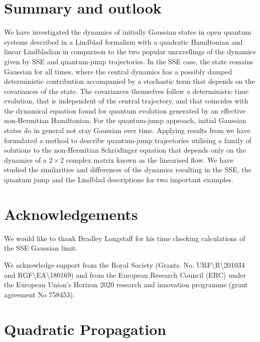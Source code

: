 \documentclass[12pt]{iopart} %
\begin{document}
\section{Summary and outlook} \label{sec:conclusion}
We have investigated the dynamics of initially Gaussian states in open quantum systems described in a Lindblad formalism with a quadratic Hamiltonian and linear Lindbladian in comparison to the two popular unravellings of the dynamics given by SSE and quantum-jump trajectories. In the SSE case, the state remains Gaussian for all times, where the central dynamics has a possibly damped deterministic contribution accompanied by a stochastic term that depends on the covariances of the state. The covariances themselves follow a deterministic time evolution, that is independent of the central trajectory, and that coincides with the dynamical equation found for quantum evolution generated by an effective non-Hermitian Hamiltonian. For the quantum-jump approach, initial Gaussian states do in general not stay Gaussian over time. Applying results from \cite{lasser2018non} we have formulated a method to describe quantum-jump trajectories utilising a family of solutions to the non-Hermitian Schr\"odinger equation that depends only on the dynamics of a $2\times2$ complex matrix known as the linearised flow. We have studied the similarities and differences of the dynamics resulting in the SSE, the quantum jump and the Lindblad descriptions for two important examples. 


\section{Acknowledgements}
 We would like to thank Bradley Longstaff for his time checking calculations of the SSE Gaussian limit.

We acknowledge support  from  the Royal Society (Grants. No. URF\textbackslash R\textbackslash 201034 and RGF\textbackslash EA\textbackslash 180169) and from the European Research Council (ERC) under the European Union's Horizon 2020 research and innovation programme (grant agreement No 758453).

\appendix

\section{Quadratic Propagation}\label{app:A}
 
\end{document}
